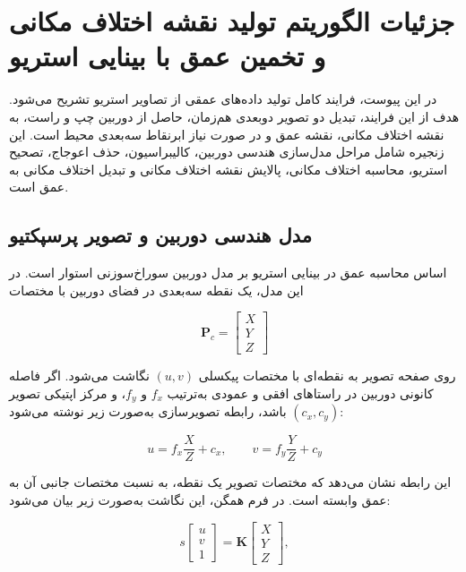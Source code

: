 \chapter{جزئیات الگوریتم تولید نقشه اختلاف مکانی و تخمین عمق با بینایی استریو}
\label{appendix:stereo_depth_sgbm}

در این پیوست، فرایند کامل تولید داده‌های عمقی از تصاویر استریو تشریح می‌شود. هدف از این فرایند، تبدیل دو تصویر دوبعدی هم‌زمان، حاصل از دوربین چپ و راست، به نقشه اختلاف مکانی، نقشه عمق و در صورت نیاز ابرنقاط سه‌بعدی محیط است. این زنجیره شامل مراحل مدل‌سازی هندسی دوربین، کالیبراسیون، حذف اعوجاج، تصحیح استریو، محاسبه اختلاف مکانی، پالایش نقشه اختلاف مکانی و تبدیل اختلاف مکانی به عمق است.

\section{مدل هندسی دوربین و تصویر پرسپکتیو}

اساس محاسبه عمق در بینایی استریو بر مدل دوربین سوراخ‌سوزنی%
استوار است. در این مدل، یک نقطه سه‌بعدی در فضای دوربین با مختصات

\begin{equation}
	\mathbf{P}_c =
	\begin{bmatrix}
		X \\
		Y \\
		Z
	\end{bmatrix}
\end{equation}

روی صفحه تصویر به نقطه‌ای با مختصات پیکسلی \((u,v)\) نگاشت می‌شود. اگر فاصله کانونی دوربین در راستاهای افقی و عمودی به‌ترتیب \(f_x\) و \(f_y\)، و مرکز اپتیکی تصویر \((c_x,c_y)\) باشد، رابطه تصویرسازی به‌صورت زیر نوشته می‌شود:

\begin{equation}
	u = f_x \frac{X}{Z} + c_x,
	\qquad
	v = f_y \frac{Y}{Z} + c_y
	\label{eq:pinhole_projection_uv}
\end{equation}

این رابطه نشان می‌دهد که مختصات تصویر یک نقطه، به نسبت مختصات جانبی آن به عمق وابسته است. در فرم همگن، این نگاشت به‌صورت زیر بیان می‌شود:

\begin{equation}
	s
	\begin{bmatrix}
		u \\
		v \\
		1
	\end{bmatrix}
	=
	\mathbf{K}
	\begin{bmatrix}
		X \\
		Y \\
		Z
	\end{bmatrix},
	\label{eq:camera_projection_homogeneous}
\end{equation}

